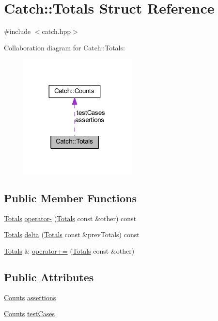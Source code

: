 \hypertarget{struct_catch_1_1_totals}{}\section{Catch\+:\+:Totals Struct Reference}
\label{struct_catch_1_1_totals}


{\ttfamily \#include $<$catch.\+hpp$>$}



Collaboration diagram for Catch\+:\+:Totals\+:\nopagebreak
\begin{figure}[H]
\begin{center}
\leavevmode
\includegraphics[width=168pt]{struct_catch_1_1_totals__coll__graph}
\end{center}
\end{figure}
\subsection*{Public Member Functions}
\begin{DoxyCompactItemize}
\item 
\hyperlink{struct_catch_1_1_totals}{Totals} \hyperlink{struct_catch_1_1_totals_a9279ed39139cb7e7b291918a6d08290e}{operator-\/} (\hyperlink{struct_catch_1_1_totals}{Totals} const \&other) const
\item 
\hyperlink{struct_catch_1_1_totals}{Totals} \hyperlink{struct_catch_1_1_totals_a1a94a654f5f3786b75695e081fc9bca2}{delta} (\hyperlink{struct_catch_1_1_totals}{Totals} const \&prev\+Totals) const
\item 
\hyperlink{struct_catch_1_1_totals}{Totals} \& \hyperlink{struct_catch_1_1_totals_a574015076e54cc405c70b053e3356e43}{operator+=} (\hyperlink{struct_catch_1_1_totals}{Totals} const \&other)
\end{DoxyCompactItemize}
\subsection*{Public Attributes}
\begin{DoxyCompactItemize}
\item 
\hyperlink{struct_catch_1_1_counts}{Counts} \hyperlink{struct_catch_1_1_totals_a885ded66df752147b30c3d45aa602ec9}{assertions}
\item 
\hyperlink{struct_catch_1_1_counts}{Counts} \hyperlink{struct_catch_1_1_totals_adb195fe477aedee2ecea88c888f16506}{test\+Cases}
\end{DoxyCompactItemize}


